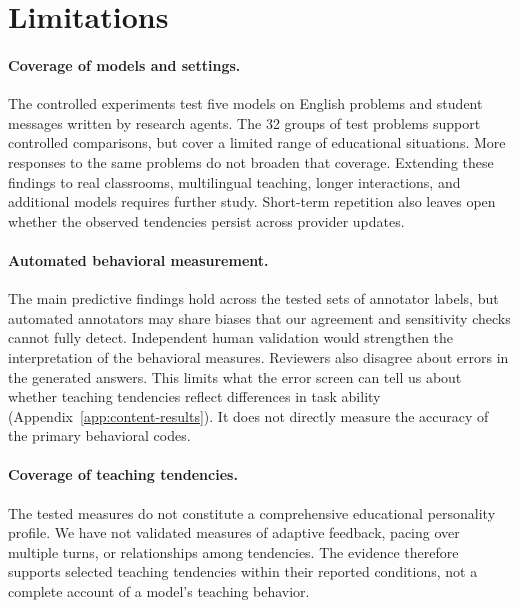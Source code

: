 \section*{Limitations}

\paragraph{Coverage of models and settings.}
The controlled experiments test five models on English problems and student
messages written by research agents. The 32 groups of test problems support
controlled comparisons, but cover a limited range of educational situations.
More responses to the same problems do not broaden that coverage. Extending these findings
to real classrooms, multilingual teaching, longer interactions, and additional
models requires further study. Short-term repetition also leaves open whether
the observed tendencies persist across provider updates.

\paragraph{Automated behavioral measurement.}
The main predictive findings hold across the tested sets of annotator labels,
but automated annotators may share biases that our agreement and sensitivity
checks cannot fully detect. Independent human validation would strengthen the interpretation
of the behavioral measures. Reviewers also disagree about errors in the generated answers. This limits
what the error screen can tell us about whether teaching tendencies reflect
differences in task ability
(Appendix~\ref{app:content-results}). It does not directly measure the accuracy
of the primary behavioral codes.

\paragraph{Coverage of teaching tendencies.}
The tested measures do not constitute a comprehensive educational personality
profile. We have not validated measures of adaptive feedback, pacing over multiple
turns, or relationships among tendencies. The evidence therefore
supports selected teaching tendencies within their reported conditions,
not a complete account of a model's teaching behavior.

